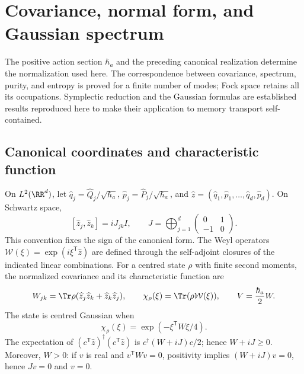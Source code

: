 \section{Covariance, normal form, and Gaussian spectrum}
\label{app:gaussianas-espectro}

The positive action section \(\hbar_a\) and the preceding canonical realization determine the normalization used here. The correspondence between covariance, spectrum, purity, and entropy is proved for a finite number of modes; Fock space retains all its occupations. Symplectic reduction and the Gaussian formulas are established results reproduced here to make their application to memory transport self-contained.

\subsection{Canonical coordinates and characteristic function}
On \(L^2(\RR^d)\), let \(\widehat q_j=\widehat Q_j/\sqrt{\hbar_a}\), \(\widehat p_j=\widehat P_j/\sqrt{\hbar_a}\), and \(\widehat z=(\widehat q_1,\widehat p_1,\ldots,\widehat q_d,\widehat p_d)\). On Schwartz space,
\[
 [\widehat z_j,\widehat z_k]=iJ_{jk}I,\qquad
 J=\bigoplus_{j=1}^d\begin{pmatrix}0&1\\-1&0\end{pmatrix}.
\]
This convention fixes the sign of the canonical form. The Weyl operators \(\mathcal W(\xi)=\exp(i\xi^{\mathsf T}\widehat z)\) are defined through the self-adjoint closures of the indicated linear combinations. For a centred state \(\rho\) with finite second moments, the normalized covariance and its characteristic function are
\[
 W_{jk}=\Tr\rho(\widehat z_j\widehat z_k+\widehat z_k\widehat z_j),
 \qquad \chi_\rho(\xi)=\Tr(\rho\mathcal W(\xi)),\qquad
 V=\frac{\hbar_a}{2}W.
\]
The state is centred Gaussian when
\begin{equation}
 \chi_\rho(\xi)=\exp(-\xi^{\mathsf T}W\xi/4).
 \label{app:eq:caracteristica-gaussiana}
\end{equation}
The expectation of \((c^{\mathsf T}\widehat z)^\dagger
(c^{\mathsf T}\widehat z)\) is \(c^\dagger(W+iJ)c/2\); hence \(W+iJ\geq0\). Moreover, \(W>0\): if \(v\) is real and \(v^{\mathsf T}Wv=0\), positivity implies \((W+iJ)v=0\), hence \(Jv=0\) and \(v=0\).

